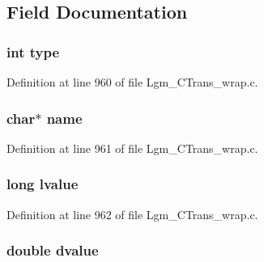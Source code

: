 \subsection{Field Documentation}
\hypertarget{structswig__const__info_c765329451135abec74c45e1897abf26}{
\subsubsection[{type}]{\setlength{\rightskip}{0pt plus 5cm}int {\bf type}}}
\label{structswig__const__info_c765329451135abec74c45e1897abf26}




Definition at line 960 of file Lgm\_\-CTrans\_\-wrap.c.\hypertarget{structswig__const__info_5ac083a645d964373f022d03df4849c8}{
\subsubsection[{name}]{\setlength{\rightskip}{0pt plus 5cm}char$\ast$ {\bf name}}}
\label{structswig__const__info_5ac083a645d964373f022d03df4849c8}




Definition at line 961 of file Lgm\_\-CTrans\_\-wrap.c.\hypertarget{structswig__const__info_d27f45c6331d8b6ac603e0cae235fb61}{
\subsubsection[{lvalue}]{\setlength{\rightskip}{0pt plus 5cm}long {\bf lvalue}}}
\label{structswig__const__info_d27f45c6331d8b6ac603e0cae235fb61}




Definition at line 962 of file Lgm\_\-CTrans\_\-wrap.c.\hypertarget{structswig__const__info_b88920172b5a32b077bd95bb1f3d6f8e}{
\subsubsection[{dvalue}]{\setlength{\rightskip}{0pt plus 5cm}double {\bf dvalue}}}
\label{structswig__const__info_b88920172b5a32b077bd95bb1f3d6f8e}




